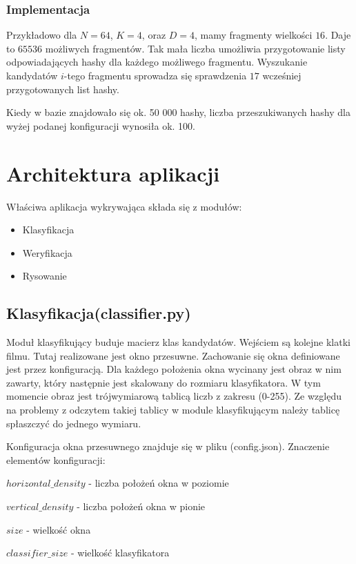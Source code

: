\documentclass[10pt,a4paper]{article}
\begin{document}
\subsubsection{Implementacja}

Przykładowo dla $N=64$, $K=4$, oraz $D=4$, mamy fragmenty wielkości $16$. Daje to $65 536$ możliwych fragmentów. Tak mała liczba umożliwia przygotowanie listy odpowiadających hashy dla każdego możliwego fragmentu. Wyszukanie kandydatów $i$-tego fragmentu sprowadza się sprawdzenia $17$ wcześniej przygotowanych list hashy.

Kiedy w bazie znajdowało się ok. 50 000 hashy, liczba przeszukiwanych hashy dla wyżej podanej konfiguracji wynosiła ok. 100.

\section{Architektura aplikacji}

Właściwa aplikacja wykrywająca składa się z modułów:
\begin{itemize}
  \item Klasyfikacja
  \item Weryfikacja
  \item Rysowanie
\end{itemize}

\subsection{Klasyfikacja(classifier.py)}

Moduł klasyfikujący buduje macierz klas kandydatów. Wejściem są kolejne klatki filmu. Tutaj realizowane jest okno przesuwne. Zachowanie się okna definiowane jest przez konfiguracją. Dla każdego położenia okna wycinany jest obraz w nim zawarty, który następnie jest skalowany do rozmiaru klasyfikatora. W tym momencie obraz jest trójwymiarową tablicą liczb z zakresu (0-255). Ze względu na problemy z odczytem takiej tablicy w module klasyfikującym należy tablicę spłaszczyć do jednego wymiaru.

Konfiguracja okna przesuwnego znajduje się w pliku (config.json). Znaczenie elementów konfiguracji:

$horizontal\_density$ - liczba położeń okna w poziomie

$vertical\_density$ - liczba położeń okna w pionie

$size$ - wielkość okna

$classifier\_size$ - wielkość klasyfikatora 
\end{document}
